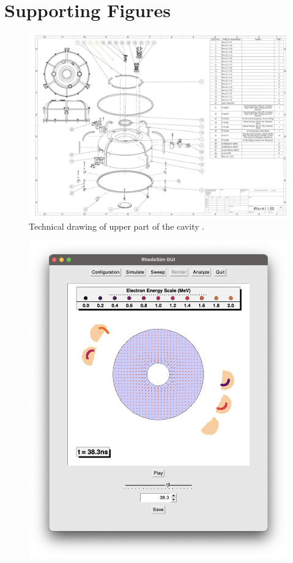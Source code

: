 \documentclass[a4paper,oneside,12pt]{report}
\numberwithin{equation}{chapter}
\begin{document}
{\chapter{Supporting Figures} \label{appendix:supp}
\vspace{30pt}
\begin{figure}[H]
    \centering
    \includegraphics[angle=90,origin=c, width=.8\linewidth]{./figures/teknikcizim/Rho-A1.1.00.pdf}
    \vspace{10pt}
    \caption{Technical drawing of upper part of the cavity \cite{sinan}.}
    \label{fig:techd_up}
\end{figure}

\vspace{-30pt}
\begin{figure}[H]
    \centering
    \includegraphics[width=\linewidth]{./figures/rhodoSim/GUI_render_frame_6.png}
    

\end{figure}}
\end{document}
